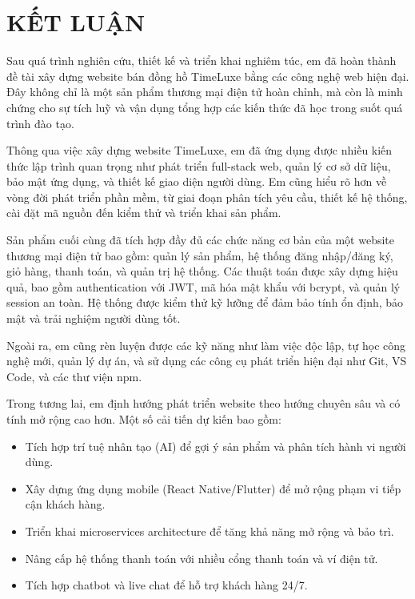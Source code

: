 \chapter*{KẾT LUẬN}

Sau quá trình nghiên cứu, thiết kế và triển khai nghiêm túc, em đã hoàn thành đề tài xây dựng website bán đồng hồ TimeLuxe bằng các công nghệ web hiện đại. Đây không chỉ là một sản phẩm thương mại điện tử hoàn chỉnh, mà còn là minh chứng cho sự tích luỹ và vận dụng tổng hợp các kiến thức đã học trong suốt quá trình đào tạo.

Thông qua việc xây dựng website TimeLuxe, em đã ứng dụng được nhiều kiến thức lập trình quan trọng như phát triển full-stack web, quản lý cơ sở dữ liệu, bảo mật ứng dụng, và thiết kế giao diện người dùng. Em cũng hiểu rõ hơn về vòng đời phát triển phần mềm, từ giai đoạn phân tích yêu cầu, thiết kế hệ thống, cài đặt mã nguồn đến kiểm thử và triển khai sản phẩm.

Sản phẩm cuối cùng đã tích hợp đầy đủ các chức năng cơ bản của một website thương mại điện tử bao gồm: quản lý sản phẩm, hệ thống đăng nhập/đăng ký, giỏ hàng, thanh toán, và quản trị hệ thống. Các thuật toán được xây dựng hiệu quả, bao gồm authentication với JWT, mã hóa mật khẩu với bcrypt, và quản lý session an toàn. Hệ thống được kiểm thử kỹ lưỡng để đảm bảo tính ổn định, bảo mật và trải nghiệm người dùng tốt.

Ngoài ra, em cũng rèn luyện được các kỹ năng như làm việc độc lập, tự học công nghệ mới, quản lý dự án, và sử dụng các công cụ phát triển hiện đại như Git, VS Code, và các thư viện npm.

Trong tương lai, em định hướng phát triển website theo hướng chuyên sâu và có tính mở rộng cao hơn. Một số cải tiến dự kiến bao gồm:

\begin{itemize}
    \item Tích hợp trí tuệ nhân tạo (AI) để gợi ý sản phẩm và phân tích hành vi người dùng.
    \item Xây dựng ứng dụng mobile (React Native/Flutter) để mở rộng phạm vi tiếp cận khách hàng.
    \item Triển khai microservices architecture để tăng khả năng mở rộng và bảo trì.
    \item Nâng cấp hệ thống thanh toán với nhiều cổng thanh toán và ví điện tử.
    \item Tích hợp chatbot và live chat để hỗ trợ khách hàng 24/7.
\end{itemize}

